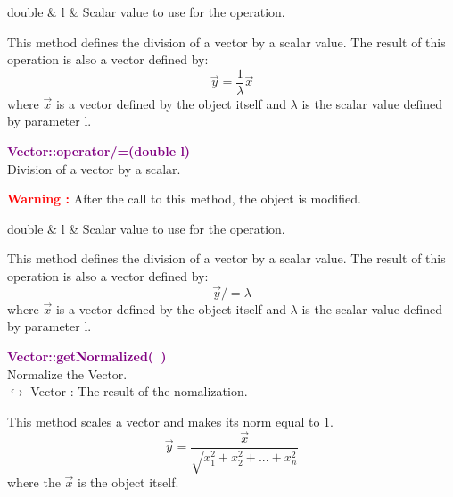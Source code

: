 \begin{tcolorbox}[width=\textwidth,myArgs,tabularx={ll|R}]
double & l & Scalar value to use for the operation.
\end{tcolorbox}

This method defines the division of a vector by a scalar value.
The result of this operation is also a vector defined by:
\begin{equation*}
\overrightarrow{y} = \frac{1}{\lambda} \overrightarrow{x}
\end{equation*}
where $\overrightarrow{x}$ is a vector defined by the object itself and $\lambda$ is the scalar value defined by parameter l.

\textcolor{purple}{\textbf{Vector::operator/=(double l)}}\label{Vector::operator/=(double l)}\\
Division of a vector by a scalar.

\hspace*{10mm}\textcolor{red}{\textbf{Warning :}} After the call to this method, the object is modified.

\begin{tcolorbox}[width=\textwidth,myArgs,tabularx={ll|R}]
double & l & Scalar value to use for the operation.
\end{tcolorbox}

This method defines the division of a vector by a scalar value.
The result of this operation is also a vector defined by:
\begin{equation*}
\overrightarrow{y} /= \lambda
\end{equation*}
where $\overrightarrow{x}$ is a vector defined by the object itself and $\lambda$ is the scalar value defined by parameter l.

\textcolor{purple}{\textbf{Vector::getNormalized(~)}}\label{Vector::getNormalized()}\\
Normalize the Vector.\\ \hspace*{10mm}$\hookrightarrow$  Vector : The result of the nomalization.

This method scales a vector and makes its norm equal to $1$.
\begin{equation*}
\overrightarrow{y} = \frac{\overrightarrow{x}}{\sqrt {x_{1}^2 + x_{2}^2 + ... + x_{n}^2}}
\end{equation*}
where the $\overrightarrow{x}$ is the object itself.


